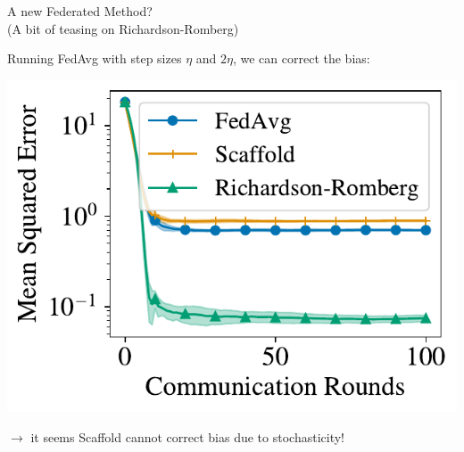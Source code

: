 \documentclass[aspectratio=169,14pt]{beamer}
\begin{document}
  \begin{frame}{A new Federated Method?\\[-0.5em]
    \small (A bit of teasing on Richardson-Romberg)}
    \vspace{-1em}
    
    Running FedAvg with step sizes $\eta$ and $2 \eta$, we can correct the bias:

    \vspace{-1em}
    
    \begin{center}
      \includegraphics[width=0.5\linewidth]{images/heterogeneous_mixed_100.pdf}
    \end{center}

    \vspace{-1.5em}

    $\rightarrow$ it seems Scaffold cannot correct bias due to stochasticity!

  \end{frame}
  
\end{document}
